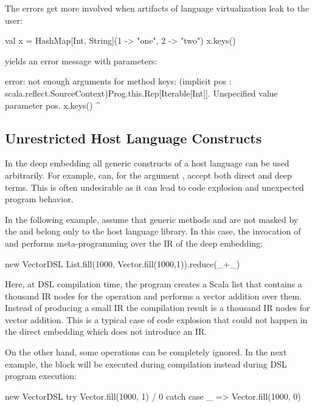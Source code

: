 The errors get more involved when artifacts of language virtualization leak to the user:\begin{lstparagraph}
val x = HashMap[Int, String](1 -> "one", 2 -> "two")
x.keys()
\end{lstparagraph} yields an error message with  parameters:\begin{lstparagraph}
error: not enough arguments for method keys: (implicit pos
: scala.reflect.SourceContext)Prog.this.Rep[Iterable[Int]].
Unspecified value parameter pos.
  x.keys()
        ^
\end{lstparagraph}

\subsection{Unrestricted Host Language Constructs}
\label{sec:unrestricted-language}

In the deep embedding all generic constructs of a host language can be
 used arbitrarily. For example, 
 can, for the argument , accept both direct and deep terms.
 This is often undesirable as it can lead to code explosion and unexpected program behavior.

In the following example, assume that generic methods  and
   are not masked by the  and belong only to the host
  language library. In this case, the invocation of  and 
  performs meta-programming over the IR of the deep embedding:\begin{lstparagraph}
new VectorDSL {
  List.fill(1000, Vector.fill(1000,1)).reduce(_+_)
}
\end{lstparagraph}

Here, at DSL compilation time, the program creates a Scala list that contains a thousand
IR nodes for the  operation and performs a vector addition over them.
Instead of producing a small IR the compilation result is a thousand IR nodes for
vector addition. This is a typical case of code explosion that could not happen
in the direct embedding which does not introduce an IR.

On the other hand, some operations can be completely ignored. In the next
example, the  block will be executed during \edsl compilation
instead during DSL program execution:\begin{lstparagraph}
new VectorDSL {
  try Vector.fill(1000, 1) / 0
  catch { case _ => Vector.fill(1000, 0) }
}
\end{lstparagraph}

